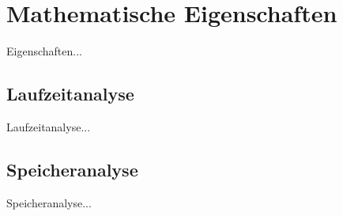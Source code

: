\section{Mathematische Eigenschaften}
Eigenschaften...
\subsection{Laufzeitanalyse}
Laufzeitanalyse...
\subsection{Speicheranalyse}
Speicheranalyse...
